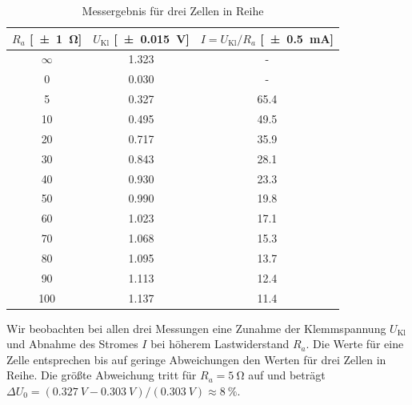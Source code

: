 \begin{table}[H]
  \centering
  \begin{tabular}{c c c} \toprule
    $R_a$ [\SI{\pm1}{\ohm}] & $U_{\text{Kl}}$ [\SI{\pm .015}{V}] & $I=U_{\text{Kl}}/R_a$ [\SI{\pm .5}{mA}] \\ \midrule
    $\infty$ & \num{1.323} & - \\
    0 & \num{0.030} & - \\
    5 & \num{0.327} & \num{65.4} \\
    10 & \num{.495} & \num{49.5} \\
    20 & \num{.717} & \num{35.9} \\
    30 & \num{.843} & \num{28.1} \\
    40 & \num{.930} & \num{23.3} \\
    50 & \num{.990} & \num{19.8} \\
    60 & \num{1.023} & \num{17.1} \\
    70 & \num{1.068} & \num{15.3} \\
    80 & \num{1.095} & \num{13.7} \\
    90 & \num{1.113} & \num{12.4} \\
    100 & \num{1.137} & \num{11.4} \\ \bottomrule
  \end{tabular}
  \caption{Messergebnis für drei Zellen in Reihe}
  \label{tab:einezelle}
\end{table}
Wir beobachten bei allen drei Messungen eine Zunahme der Klemmspannung $U_{\text{Kl}}$ und Abnahme des Stromes $I$ bei höherem Lastwiderstand $R_a$. Die Werte für eine Zelle entsprechen bis auf geringe Abweichungen den Werten für drei Zellen in Reihe. Die größte Abweichung tritt für $R_a=\SI{5}{\ohm}$ auf und beträgt $\Delta U_0=(\SI{0.327}{V}-\SI{0.303}{V})/(\SI{0.303}{V})\approx \SI{8}{\percent}$.

